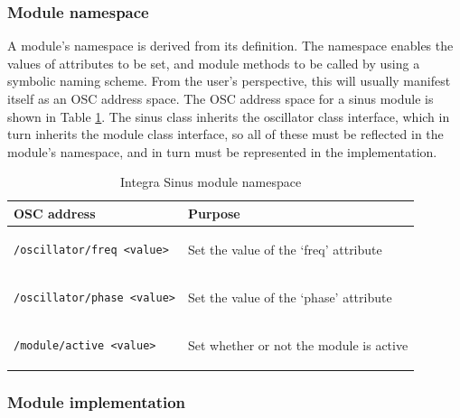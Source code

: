 \documentclass[10pt,journal,final]{IEEEtran}
\begin{document}
\subsubsection{Module namespace}\label{subsubsec:module_namespace}

A module's namespace is derived from its definition. The namespace enables the values of attributes to be set, and module methods to be called  by using a symbolic naming scheme.  From the user's perspective, this will usually manifest itself as an OSC address space. The OSC address space for a sinus module is shown in Table \ref{tab:module_namespace}. The sinus class inherits the oscillator class interface, which in turn inherits the module class interface, so all of these must be reflected in the module's namespace, and in turn must be represented in the implementation.

\begin{table}[h]
\caption{Integra Sinus module namespace}
\begin{center}
\begin{tabular}{|p{17em}|p{8em}|} %
\hline
\textbf{OSC address} & \textbf{Purpose} \\
\hline
\begin{minipage}[0pt]{10em}
\small {
\begin{verbatim}/oscillator/freq <value>\end{verbatim}}\end{minipage}  & \small{Set the value of the `freq' attribute} \\
\hline
\begin{minipage}[0pt]{10em}
\small{
\begin{verbatim}/oscillator/phase <value>\end{verbatim}}\end{minipage}  & \small{Set the value of the `phase' attribute} \\
\hline
\begin{minipage}[0pt]{10em}
\small{
\begin{verbatim}/module/active <value>
\end{verbatim}} \end{minipage} & \small{Set whether or not the module is active} \\
\hline
\end{tabular} 
\end{center}
\label{tab:module_namespace}
\end{table}

\subsubsection{Module implementation}\label{subsubsec:module_implementation}
\end{document}
